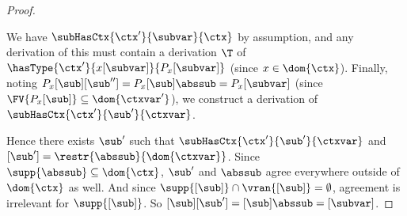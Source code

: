 \begin{proof}
\begin{itemize}
  We have $\subHasCtx{\ctx'}{\subvar}{\ctx}$ by assumption, and any derivation of this must contain a derivation $\T$ of $\hasType{\ctx'}{x[\subvar]}{P_x[\subvar]}$ (since $x \in \dom{\ctx}$).
  Finally, noting $P_x[\sub][\sub''] = P_x[\sub]\abssub = P_x[\subvar]$ (since $\FV{P_x[\sub]} \subseteq \dom{\ctxvar'}$), we construct a derivation of $\subHasCtx{\ctx'}{\sub'}{\ctxvar}$.
  \begin{prooftree}
  \end{prooftree}
\end{itemize}
Hence there exists $\sub'$ such that $\subHasCtx{\ctx'}{\sub'}{\ctxvar}$ and $[\sub'] = \restr{\abssub}{\dom{\ctxvar}}$.
Since $\supp{\abssub} \subseteq \dom{\ctx}$, $\sub'$ and $\abssub$ agree everywhere outside of $\dom{\ctx}$ as well.
And since $\supp{[\sub]} \cap \vran{[\sub]} = \emptyset$, agreement is irrelevant for $\supp{[\sub]}$.
So $[\sub][\sub'] = [\sub]\abssub = [\subvar]$.
\end{proof}

